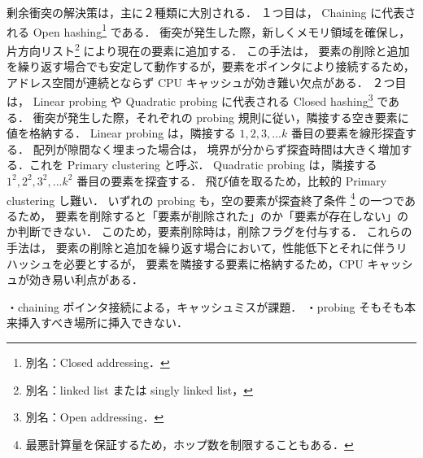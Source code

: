 剰余衝突の解決策は，主に２種類に大別される．
１つ目は，
Chaining に代表される Open hashing\footnote{別名：Closed addressing．} である．
衝突が発生した際，新しくメモリ領域を確保し，片方向リスト\footnote{別名：linked list または singly linked list，} により現在の要素に追加する．
この手法は，
要素の削除と追加を繰り返す場合でも安定して動作するが，要素をポインタにより接続するため，
アドレス空間が連続とならず CPU キャッシュが効き難い欠点がある．
２つ目は，
Linear probing や Quadratic probing に代表される Closed hashing\footnote{別名：Open addressing．} である．
衝突が発生した際，それぞれの probing 規則に従い，隣接する空き要素に値を格納する．
Linear probing は，隣接する $1, 2, 3, ... k$ 番目の要素を線形探査する．
配列が隙間なく埋まった場合は，
境界が分からず探査時間は大きく増加する．これを Primary clustering と呼ぶ．
Quadratic probing は，隣接する $1^2, 2^2, 3^2, ... k^2$ 番目の要素を探査する．
飛び値を取るため，比較的 Primary clustering し難い．
いずれの probing も，空の要素が探査終了条件 \footnote{最悪計算量を保証するため，ホップ数を制限することもある．} の一つであるため，
要素を削除すると「要素が削除された」のか「要素が存在しない」のか判断できない．
このため，要素削除時は，削除フラグを付与する．
これらの手法は，
要素の削除と追加を繰り返す場合において，性能低下とそれに伴うリハッシュを必要とするが，
要素を隣接する要素に格納するため，CPU キャッシュが効き易い利点がある．




・chaining ポインタ接続による，キャッシュミスが課題．
・probing
そもそも本来挿入すべき場所に挿入できない．






